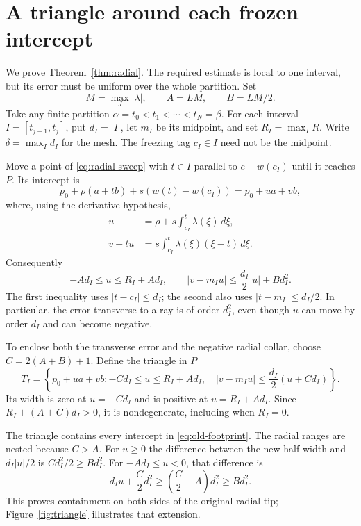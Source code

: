 \section{A triangle around each frozen intercept}
\label{sec:freezing}

We prove Theorem~\ref{thm:radial}. The required estimate is local to
one interval, but its error must be uniform over the whole partition.
Set
\[
 M=\max_J|\lambda|,\qquad A=LM,\qquad B=LM/2.
\]
Take any finite partition $\alpha=t_0<t_1<\cdots<t_N=\beta$.
For each interval $I=[t_{j-1},t_j]$, put $d_I=|I|$, let $m_I$ be
its midpoint, and set $R_I=\max_I R$. Write
$\delta=\max_I d_I$ for the mesh. The freezing tag $c_I\in I$
need not be the midpoint.

Move a point of \eqref{eq:radial-sweep} with $t\in I$ parallel to
$e+w(c_I)$ until it reaches $P$. Its intercept is
\[
 p_0+\rho(a+tb)+s(w(t)-w(c_I))=p_0+u a+v b,
\]
where, using the derivative hypothesis,
\begin{align}
 u&=\rho+s\int_{c_I}^t\lambda(\xi)\,d\xi,
 \label{eq:radial-coordinate}\\
 v-tu&=s\int_{c_I}^t\lambda(\xi)(\xi-t)\,d\xi.
 \label{eq:transverse-error}
\end{align}
Consequently
\begin{equation}\label{eq:old-footprint}
 -Ad_I\le u\le R_I+Ad_I,\qquad
 |v-m_Iu|\le\frac{d_I}{2}|u|+Bd_I^2.
\end{equation}
The first inequality uses $|t-c_I|\le d_I$; the second also uses
$|t-m_I|\le d_I/2$. In particular, the error transverse to a ray
is of order $d_I^2$, even though $u$ can move by order $d_I$ and can
become negative.

To enclose both the transverse error and the negative radial collar,
choose $C=2(A+B)+1$. Define the triangle in $P$
\begin{equation}\label{eq:triangle}
 T_I=\left\{p_0+u a+v b:
 -Cd_I\le u\le R_I+Ad_I,\quad
 |v-m_Iu|\le\frac{d_I}{2}(u+Cd_I)\right\}.
\end{equation}
Its width is zero at $u=-Cd_I$ and is positive at $u=R_I+Ad_I$.
Since $R_I+(A+C)d_I>0$, it is nondegenerate, including when $R_I=0$.

The triangle contains every intercept in
\eqref{eq:old-footprint}. The radial ranges are nested because
$C>A$. For $u\ge0$ the difference between the new half-width and
$d_I|u|/2$ is $Cd_I^2/2\ge Bd_I^2$. For $-Ad_I\le u<0$, that
difference is
\[
 d_Iu+\frac C2d_I^2\ge\left(\frac C2-A\right)d_I^2\ge Bd_I^2.
\]
This proves containment on both sides of the original radial tip;
Figure~\ref{fig:triangle} illustrates that extension.

